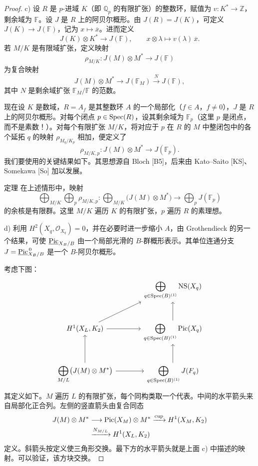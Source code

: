 \begin{proof}
c) 设 $R$ 是 $p$-进域 $K$（即 $\mathbb Q_p$ 的有限扩张）的整数环，赋值为 $v:K^*\to\mathbb Z$，剩余域为 $\mathbb F$。设 $J$ 是 $R$ 上的阿贝尔概形。由 $J(R)=J(K)$，可定义 $J(K)\to J(\mathbb F)$，记为 $x\mapsto\overline x$。进而定义
\[
 J(K)\otimes K^*\longrightarrow J(\mathbb F),
 \qquad x\otimes\lambda\longmapsto v(\lambda)\,\overline x.
\]
若 $M/K$ 是有限域扩张，定义映射
\[
 \rho_{M/K}:J(M)\otimes M^*\longrightarrow J(\mathbb F)
\]
为复合映射
\[
 J(M)\otimes M^*\longrightarrow J(\mathbb F_M)
 \xrightarrow{N}J(\mathbb F),
\]
其中 $N$ 是剩余域扩张 $\mathbb F_M/\mathbb F$ 的范数。

现在设 $K$ 是数域，$R=A_f$ 是其整数环 $A$ 的一个局部化（$f\in A$，$f\ne0$），$J$ 是 $R$ 上的阿贝尔概形。对每个闭点 $p\in\operatorname{Spec}(R)$，设其剩余域为 $\mathbb F_p$（这里 $p$ 是闭点，而不是素数！）。对每个有限扩张 $M/K$，将对应于 $p$ 在 $R$ 的 $M$ 中整闭包中的各个延拓 $q$ 的映射 $\rho_{M_q/K_p}$ 相加，便定义了
\[
 \rho_{M/K,p}:J(M)\otimes M^*\longrightarrow J(\mathbb F_p).
\]
我们要使用的关键结果如下。其思想源自 Bloch [B5]，后来由 Kato--Saito [KS]、Somekawa [So] 加以发展。

\begin{statement}{定理}
在上述情形中，映射
\[
 \bigoplus_{M/K}\bigoplus_p\rho_{M/K,p}:
 \bigoplus_{M/K}\bigl(J(M)\otimes M^*\bigr)
 \longrightarrow\bigoplus_p J(\mathbb F_p)
\]
的余核是有限群。这里 $M/K$ 遍历 $K$ 的有限扩张，$p$ 遍历 $R$ 的素理想。
\end{statement}

d) 利用 $H^2(X_q,\mathcal O_{X_q})=0$，并在必要时进一步缩小 $A$，由 Grothendieck 的另一个结果，可使 $\underline{\operatorname{Pic}}_{X_B/B}$ 由一个局部光滑的 $B$-群概形表示。其单位连通分支 $J=\underline{\operatorname{Pic}}^{\,0}_{X_B/B}$ 是一个 $B$-阿贝尔概形。

考虑下图：
\[
\begin{tikzcd}[ampersand replacement=\&,column sep=large,row sep=large]
 \& \displaystyle\bigoplus_{q\in\Spec(B)^{(1)}}\NS(X_q)\\
 H^1(X_L,\mathcal K_2) \arrow[r]\arrow[ur]
 \& \displaystyle\bigoplus_{q\in\Spec(B)^{(1)}}\Pic(X_q)\arrow[u]\\
 \displaystyle\bigoplus_{M/L}\bigl(J(M)\otimes M^*\bigr)\arrow[u]\arrow[r]
 \& \displaystyle\bigoplus_{q\in\Spec(B)^{(1)}}J(\mathbb F_q)\arrow[u]
\end{tikzcd}
\]
其定义如下。$M$ 遍历 $L$ 的有限扩张，每个同构类取一个代表。中间的水平箭头来自局部化正合列。左侧的竖直箭头由复合同态
\[
\begin{split}
 J(M)\otimes M^*&\longrightarrow\operatorname{Pic}(X_M)\otimes M^*
 \xrightarrow{\mathrm{cup}}H^1(X_M,K_2)\\
 &\xrightarrow{N_{M/L}}H^1(X_L,K_2)
\end{split}
\]
定义。斜箭头按定义使三角形交换。最下方的水平箭头就是上面 c) 中描述的映射。可以验证，该方块交换。


\end{proof}
